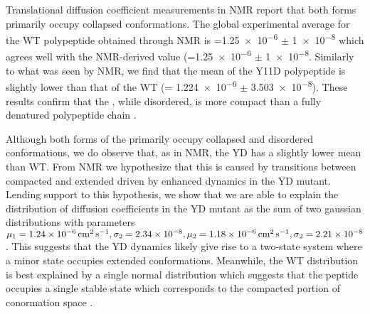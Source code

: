 
Translational diffusion coefficient measurements in NMR report that both \gct forms primarily occupy collapsed conformations. The global experimental average for the WT polypeptide obtained through NMR is \diffusion=\num{1.25e-6} $\pm$  \SI{1e-8}{\dcunits} which agrees well with the NMR-derived value (\diffusion=\num{1.25e-6} $\pm$  \SI{1e-8}{\dcunits}. Similarly to what was seen by NMR, we find that the mean \diffusion of the Y11D \gct polypeptide is slightly lower than that of the WT \gct (\diffusion= \num{1.224e-6} $\pm$ \SI{3.503e-8}{\dcunits}). These results confirm that the \gct, while disordered, is more compact than a fully denatured polypeptide chain . 

Although both forms of the \gct primarily occupy collapsed and disordered conformations, we do observe that, as in NMR, the YD \gct has a slightly lower mean \diffusion than WT. From NMR we hypothesize that this is caused by transitions between compacted and extended driven by enhanced dynamics in the YD mutant. Lending support to this hypothesis, we show that we are able to explain the distribution of diffusion coefficients in the YD mutant as the sum of two gaussian distributions with parameters $\mu_1 =\SI{1.24e-6}{\dcunits}, \sigma_2= \num{2.34e-8}, \mu_2 =\SI{1.18e-6}{\dcunits}, \sigma_2= \num{2.21e-8}$ . This suggests that the YD dynamics likely give rise to a two-state system where a minor state occupies extended conformations. Meanwhile, the WT \diffusion distribution is best explained by a single normal distribution which suggests that the peptide occupies a single stable state which corresponds to the compacted portion of conormation space .

\begin{figure}
\centering     %
{}
\label{fig:dchist}
\end{figure}



\begin{figure}
	\centering     %
\end{figure}


